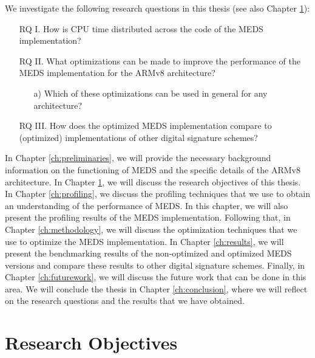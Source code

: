 \documentclass[11pt,a4paper]{report}
\theoremstyle{definition}
\begin{document}
We investigate the following research questions in this thesis (see also Chapter \ref{ch:researchobjectives}):
\begin{itemize}[left=35pt,labelsep=15pt]
  \item[RQ I.] How is CPU time distributed across the code of the MEDS implementation?
  \item[RQ II.] What optimizations can be made to improve the performance of the MEDS implementation for the ARMv8 architecture?
  \begin{itemize}
    \item[a)] Which of these optimizations can be used in general for any 
    architecture?
  \end{itemize}
  \item[RQ III.] How does the optimized MEDS implementation compare to (optimized) implementations of other digital signature schemes?
\end{itemize}

In Chapter \ref{ch:preliminaries}, we will provide the necessary background information on the functioning of MEDS and the specific details of the ARMv8 architecture. In Chapter \ref{ch:researchobjectives}, we will discuss the research objectives of this thesis. In Chapter \ref{ch:profiling}, we discuss the profiling techniques that we use to obtain an understanding of the performance of MEDS. In this chapter, we will also present the profiling results of the MEDS implementation. Following that, in Chapter \ref{ch:methodology}, we will discuss the optimization techniques that we use to optimize the MEDS implementation. In Chapter \ref{ch:results}, we will present the benchmarking results of the non-optimized and optimized MEDS versions and compare these results to other digital signature schemes. Finally, in Chapter \ref{ch:futurework}, we will discuss the future work that can be done in this area. We will conclude the thesis in Chapter \ref{ch:conclusion}, where we will reflect on the research questions and the results that we have obtained.


\chapter{Research Objectives}
\label{ch:researchobjectives}
\end{document}
